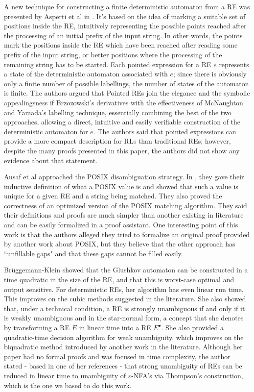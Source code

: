 \documentclass[oneside,12pt]{scrbook}
\theoremstyle{definition}
\theoremstyle{plain}
\theoremstyle{definition}
\begin{document}
A new technique for constructing a finite deterministic automaton from a RE was presented by Asperti et al in \cite{Asperti10}. It's based on the idea of marking a suitable set of positions inside the RE, intuitively representing the possible points reached after the processing of an initial prefix of the input string. In other words, the points mark the positions inside the RE which have been reached after reading some prefix of the input string, or better positions where the processing of the remaining string has to be started. Each pointed expression for a RE $e$ represents a state of the deterministic automaton associated with $e$; since there is obviously only a finite number of possible labellings, the number of states of the automaton is finite. The authors argued that Pointed REs join the elegance and the symbolic appealingsness if Brzozowski's derivatives with the effectiveness of McNaughton and Yamada's labelling technique, essentially combining the best of the two approaches, allowing a direct, intuitive and easily verifiable construction of the deterministic automaton for $e$. The authors said that pointed expressions can provide a more compact description for RLs than traditional REs; however, despite the many proofs presented in this paper, the authors did not show any evidence about that statement.

Ausaf et al approached the POSIX disambiguation strategy. In \cite{Ausaf16}, they gave their inductive definition of what a POSIX value is and showed that such a value is unique for a given RE and a string being matched. They also proved the correctness of an optimized version of the POSIX matching algorithm. They said their definitions and proofs are much simpler than another existing in literature and can be easily formalized in a proof assistant. One interesting point of this work is that the authors alleged they tried to formalize an original proof provided by another work about POSIX, but they believe that the other approach has ``unfillable gaps" and that these gaps cannot be filled easily.

Br{\"{u}}ggemann-Klein \cite{Bruggemann-Klein1992} showed that the Glushkov automaton can be constructed in a time quadratic in the size of the RE, and that this is worst-case optimal and output sensitive. For deterministic REs, her algorithm has even linear run time. This improves on the cubic methods suggested in the literature. She also showed that, under a technical condition, a RE is strongly unambiguous if and only if it is weakly unambiguous and in the star-normal form, a concept that she denotes by transforming a RE $E$ in linear time into a RE $E^ \bullet$. She also provided a quadratic-time decision algorithm for weak unambiguity, which improves on the biquadratic method introduced by another work in the literature. Although her paper had no formal proofs and was focused in time complexity, the author stated - based in one of her references - that strong unambiguity of REs can be reduced in linear time to unambiguity of $\varepsilon$-NFA's via Thompson's construction, which is the one we based to do this work.
\end{document}
